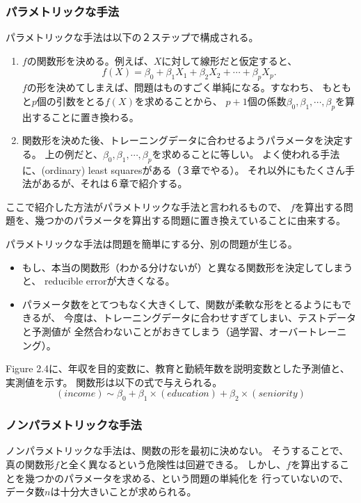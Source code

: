 \documentclass{jsbook}
\begin{document}
\subsubsection{パラメトリックな手法}
パラメトリックな手法は以下の２ステップで構成される。
\begin{enumerate}
\item $f$の関数形を決める。例えば、$X$に対して線形だと仮定すると、
	\begin{equation}
		f(X) = \beta_0 + \beta_1 X_1 + \beta_2 X_2 + \cdots + \beta_p X_p.
	\end{equation}
	$f$の形を決めてしまえば、問題はものすごく単純になる。すなわち、
	もともと$p$個の引数をとる$f(X)$を求めることから、
	$p+1$個の係数$\beta_0, \beta_1, \cdots, \beta_p$を算出することに置き換わる。
\item 関数形を決めた後、トレーニングデータに合わせるようパラメータを決定する。
	上の例だと、$\beta_0, \beta_1, \cdots, \beta_p$を求めることに等しい。
	よく使われる手法に、(ordinary) least squaresがある（３章でやる）。
	それ以外にもたくさん手法があるが、それは６章で紹介する。
\end{enumerate}
ここで紹介した方法がパラメトリックな手法と言われるもので、
$f$を算出する問題を、幾つかのパラメータを算出する問題に置き換えていることに由来する。

パラメトリックな手法は問題を簡単にする分、別の問題が生じる。
\begin{itemize}
\item もし、本当の関数形（わかる分けないが）と異なる関数形を決定してしまうと、
reducible errorが大きくなる。
\item パラメータ数をとてつもなく大きくして、関数が柔軟な形をとるようにもできるが、
今度は、トレーニングデータに合わせすぎてしまい、テストデータと予測値が
全然合わないことがおきてしまう（過学習、オーバートレーニング）。
\end{itemize}

Figure 2.4に、年収を目的変数に、教育と勤続年数を説明変数とした予測値と、実測値を示す。
関数形は以下の式で与えられる。
$$
	(income) \sim \beta_0 + \beta_1 \times (education) + \beta_2 \times (seniority)
$$

\subsubsection{ノンパラメトリックな手法}
ノンパラメトリックな手法は、関数の形を最初に決めない。
そうすることで、真の関数形$f$と全く異なるという危険性は回避できる。
しかし、$f$を算出することを幾つかのパラメータを求める、という問題の単純化を
行っていないので、データ数$n$は十分大きいことが求められる。
\end{document}
